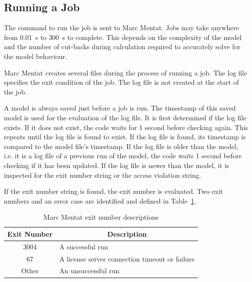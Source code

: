 \subsection{Running a Job}
\label{ssec:run}

The command to run the job is sent to Marc Mentat. Jobs may take anywhere from \SI{0.01}{\second} to \SI{300}{\second} to complete. This depends on the complexity of the model and the number of cut-backs during calculation required to accurately solve for the model behaviour.

Marc Mentat creates several files during the process of running a job. The log file specifies the exit condition of the job. The log file is not created at the start of the job.

A model is always saved just before a job is run. The timestamp of this saved model is used for the evaluation of the log file. It is first determined if the log file exists. If it does not exist, the code waits for 1 second before checking again. This repeats until the log file is found to exist. If the log file is found, its timestamp is compared to the model file's timestamp. If the log file is older than the model, i.e. it is a log file of a previous run of the model, the code waits 1 second before checking if it has been updated. If the log file is newer than the model, it is inspected for the exit number string or the access violation string.

If the exit number string is found, the exit number is evaluated. Two exit numbers and an error case are identified and defined in Table~\ref{tab:exno}.

\begin{table}[ht]
\centering
\begin{tabular}{@{}cl@{}}
\toprule
\textbf{Exit Number} & \multicolumn{1}{c}{\textbf{Description}}       \\ \midrule
3004                 & A successful run                               \\
67                   & A license server connection timeout or failure \\
Other                & An unsuccessful run                            \\ \bottomrule
\end{tabular}
\caption{Marc Mentat exit number descriptions}
\label{tab:exno}
\end{table}

